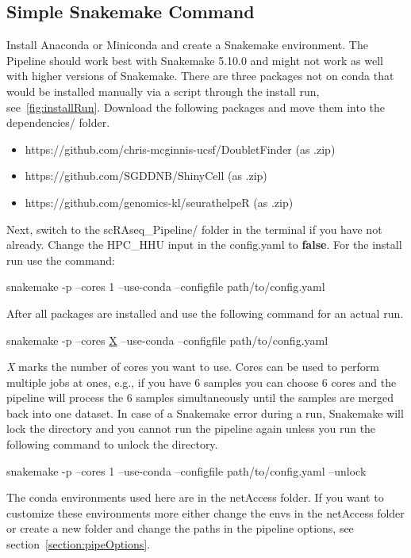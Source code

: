 \subsection{Simple Snakemake Command}
Install Anaconda or Miniconda and create a Snakemake environment. The Pipeline should work best with Snakemake 5.10.0 and might not work as well with higher versions of Snakemake. There are three packages not on conda that would be installed manually via a script through the install run, see~\ref{fig:installRun}. Download the following packages and move them into the dependencies/ folder.
\begin{itemize}
	\item https://github.com/chris-mcginnis-ucsf/DoubletFinder (as .zip)
	\item https://github.com/SGDDNB/ShinyCell (as .zip)
	\item https://github.com/genomics-kl/seurathelpeR (as .zip)
\end{itemize}
Next, switch to the scRAseq\_Pipeline/ folder in the terminal if you have not already. Change the HPC\_HHU input in the config.yaml to \textbf{false}. For the install run use the command:
\begin{center}
	snakemake -p --cores 1 --use-conda --configfile path/to/config.yaml
\end{center}
After all packages are installed and use the following command for an actual run. 
\begin{center}
	snakemake -p --cores \underline{X} --use-conda --configfile path/to/config.yaml
\end{center}
\textit{X} marks the number of cores you want to use. Cores can be used to perform multiple jobs at ones, e.g., if you have 6 samples you can choose 6 cores and the pipeline will process the 6 samples simultaneously until the samples are merged back into one dataset. In case of a Snakemake error during a run, Snakemake will lock the directory and you cannot run the pipeline again unless you run the following command to unlock the directory.
\begin{center}
	snakemake -p --cores 1 --use-conda --configfile path/to/config.yaml --unlock
\end{center}
The conda environments used here are in the netAccess folder. If you want to customize these environments more either change the envs in the netAccess folder or create a new folder and change the paths in the pipeline options, see section~\ref{section:pipeOptions}.


